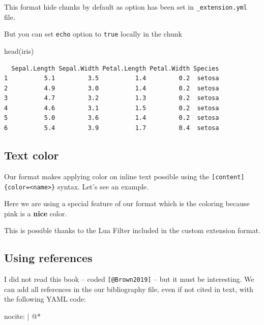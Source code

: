 \documentclass[
  12pt]{iopart}
\newenvironment{Shaded}{\begin{snugshade}}{\end{snugshade}}
\newcommand{\CharTok}[1]{\textcolor[rgb]{0.13,0.47,0.30}{#1}}
\newcommand{\FunctionTok}[1]{\textcolor[rgb]{0.28,0.35,0.67}{#1}}
\newcommand{\KeywordTok}[1]{\textcolor[rgb]{0.00,0.23,0.31}{#1}}
\newcommand{\NormalTok}[1]{\textcolor[rgb]{0.00,0.23,0.31}{#1}}
\begin{document}
This format hide chunks by default as option has been set in
\texttt{\_extension.yml} file.

But you can set \texttt{echo} option to \texttt{true} locally in the
chunk

\begin{Shaded}
\begin{Highlighting}[]
\FunctionTok{head}\NormalTok{(iris)}
\end{Highlighting}
\end{Shaded}

\begin{verbatim}
  Sepal.Length Sepal.Width Petal.Length Petal.Width Species
1          5.1         3.5          1.4         0.2  setosa
2          4.9         3.0          1.4         0.2  setosa
3          4.7         3.2          1.3         0.2  setosa
4          4.6         3.1          1.5         0.2  setosa
5          5.0         3.6          1.4         0.2  setosa
6          5.4         3.9          1.7         0.4  setosa
\end{verbatim}

\subsection{Text color}\label{sec-summary}

Our format makes applying color on inline text possible using the
\texttt{{[}content{]}\{color=\textless{}name\textgreater{}\}} syntax.
Let's see an example.

Here we are using a special feature of our format which is the coloring
because \textcolor{mypink}{pink is a \textbf{nice} color}.

This is possible thanks to the Lua Filter included in the custom
extension format.

\subsection{Using references}\label{using-references}

I did not read this book \citep{Brown2019} -- coded
\texttt{{[}@Brown2019{]}} -- but it must be interesting. We can add all
references in the our bibliography file, even if not cited in text, with
the following YAML code:

\begin{Shaded}
\begin{Highlighting}[]
\FunctionTok{nocite}\KeywordTok{: }\CharTok{|}
\NormalTok{  \textquotesingle{}@*\textquotesingle{}}
\end{Highlighting}
\end{Shaded}
\end{document}
